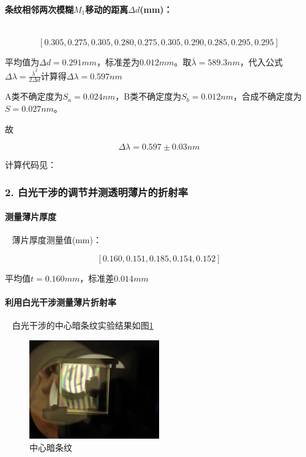 \documentclass[12pt,a4paper,UTF8]{ctexart}
\begin{document}
		\paragraph{条纹相邻两次模糊$M_1$移动的距离$\Delta d$(mm)：}~
		\newline
		\indent
		$$
		[0.305,0.275,0.305,0.280,0.275,0.305,0.290,0.285,0.295,0.295]
		$$

		平均值为$\Delta d = 0.291 mm$，标准差为$0.012mm$。取$\bar\lambda = 589.3nm$，代入公式$\Delta \lambda = \frac{\bar\lambda^2}{2\Delta d}$计算得$\Delta \lambda = 0.597nm$

		A类不确定度为$S_a = 0.024nm$，B类不确定度为$S_b = 0.012nm$，合成不确定度为$S = 0.027nm$。
		
		故

		$$
		\Delta \lambda = 0.597 \pm 0.03 nm
		$$
		
		计算代码见：
	\subsubsection*{2. 白光干涉的调节并测透明薄片的折射率}

		\paragraph{测量薄片厚度}~
		\newline
		\indent
		薄片厚度测量值(mm)：
		
		$$
		[0.160,0.151,0.185,0.154,0.152]
		$$

		平均值$t = 0.160mm$，标准差$0.014mm$

		\paragraph{利用白光干涉测量薄片折射率}~
		\newline
		\indent
		白光干涉的中心暗条纹实验结果如图\ref{fig:illus-2}
		\begin{figure}[htbp]
			\centering
			\includegraphics[width=0.5\textwidth]{attachments/illus-2.jpg}
			\caption{中心暗条纹}
			\label{fig:illus-2}
		\end{figure}
\end{document}

